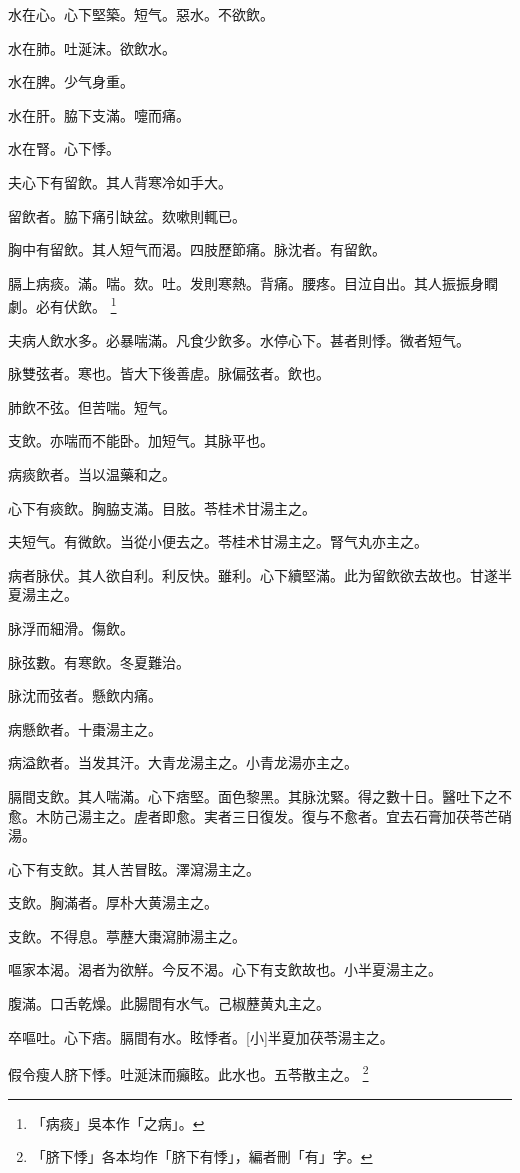 \documentclass[12pt,twoside,UTF8,b5paper]{ctexbook}
\begin{document}
水在心。心下堅築。短气。惡水。不欲飲。

水在肺。吐涎沫。欲飲水。

水在脾。少气身重。

水在肝。脇下支滿。嚏而痛。

水在腎。心下悸。

夫心下有留飲。其人背寒冷如手大。

留飲者。脇下痛引缺盆。欬嗽則輒已。

胸中有留飲。其人短气而渴。四肢歷節痛。脉沈者。有留飲。

膈上病痰。滿。喘。欬。吐。发則寒熱。背痛。腰疼。目泣自出。其人振振身瞤劇。必有伏飲。
	\footnote{「病痰」吳本作「之病」。}

夫病人飲水多。必暴喘滿。凡食少飲多。水停心下。甚者則悸。微者短气。

脉雙弦者。寒也。皆大下後善虗。脉偏弦者。飲也。

肺飲不弦。但苦喘。短气。

支飲。亦喘而不能卧。加短气。其脉平也。

病痰飲者。当以温藥和之。

心下有痰飲。胸脇支滿。目胘。苓桂术甘湯主之。

夫短气。有微飲。当從小便去之。苓桂术甘湯主之。腎气丸亦主之。

病者脉伏。其人欲自利。利反快。雖利。心下續堅滿。此为留飲欲去故也。甘遂半夏湯主之。

脉浮而細滑。傷飲。

脉弦數。有寒飲。冬夏難治。

脉沈而弦者。懸飲内痛。

病懸飲者。十棗湯主之。

病溢飲者。当发其汗。大青龙湯主之。小青龙湯亦主之。

膈間支飲。其人喘滿。心下痞堅。面色黎黑。其脉沈緊。得之數十日。醫吐下之不愈。木防己湯主之。虗者即愈。実者三日復发。復与不愈者。宜去石膏加茯苓芒硝湯。

心下有支飲。其人苦冒眩。澤瀉湯主之。

支飲。胸滿者。厚朴大黄湯主之。

支飲。不得息。葶藶大棗瀉肺湯主之。

嘔家本渴。渴者为欲觧。今反不渴。心下有支飲故也。小半夏湯主之。

腹滿。口舌乾燥。此腸間有水气。己椒藶黄丸主之。

卒嘔吐。心下痞。膈間有水。眩悸者。[小]半夏加茯苓湯主之。

假令瘦人脐下悸。吐涎沫而癲眩。此水也。五苓散主之。
	\footnote{「脐下悸」各本均作「脐下有悸」，編者刪「有」字。}
\end{document}
